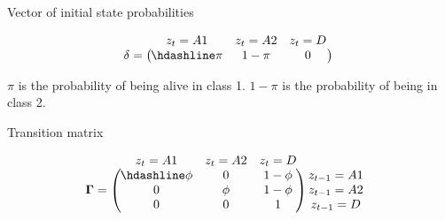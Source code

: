 \documentclass[
  12pt,
]{krantz}
\begin{document}
Vector of initial state probabilities

\[
  \begin{matrix}
& \\
\mathbf{\delta} =
  \left ( \vphantom{ \begin{matrix} 12 \end{matrix} } \right .
          \end{matrix}
          \hspace{-1.2em}
          \begin{matrix}
          z_t=A1 & z_t=A2 & z_t=D \\ \hdashline
          \pi & 1 - \pi & 0\\
          \end{matrix}
          \hspace{-0.2em}
          \begin{matrix}
          & \\
          \left . \vphantom{ \begin{matrix} 12 \end{matrix} } \right )
\begin{matrix}
\end{matrix}
\end{matrix}
\]

\(\pi\) is the probability of being alive in class 1. \(1 - \pi\) is the probability of being in class 2.

Transition matrix

\[
  \begin{matrix}
& \\
\mathbf{\Gamma} =
  \left ( \vphantom{ \begin{matrix} 12 \\ 12 \\ 12 \end{matrix} } \right .
          \end{matrix}
          \hspace{-1.2em}
          \begin{matrix}
          z_t=A1 & z_t=A2 & z_t=D \\ \hdashline
          \phi  & 0 & 1 - \phi\\
          0 & \phi & 1 - \phi\\
          0 & 0 & 1
          \end{matrix}
          \hspace{-0.2em}
          \begin{matrix}
          & \\
          \left . \vphantom{ \begin{matrix} 12 \\ 12 \\ 12 \end{matrix} } \right )
\begin{matrix}
z_{t-1}=A1 \\ z_{t-1}=A2 \\ z_{t-1}=D
\end{matrix}
\end{matrix}
\]
\end{document}
